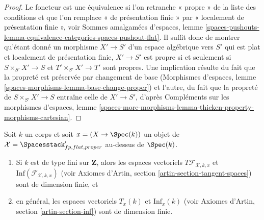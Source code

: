 \begin{proof}
Le foncteur est une équivalence si l'on retranche « propre » de la liste des
conditions et que l'on remplace « de présentation finie » par
« localement de présentation finie », voir Sommes amalgamées d'espaces, lemme
\ref{spaces-pushouts-lemma-equivalence-categories-spaces-pushout-flat}.
Il suffit donc de montrer qu'étant donné un morphisme $X' \to S'$ d'un espace
algébrique vers $S'$ qui est plat et localement de présentation finie,
$X' \to S'$ est propre si et seulement si
$S \times_{S'} X' \to S$ et $T' \times_{S'} X' \to T'$ sont propres.
Une implication résulte du fait que la propreté est préservée par changement de
base (Morphismes d'espaces, lemme
\ref{spaces-morphisms-lemma-base-change-proper}) et l'autre, du fait que la
propreté de $S \times_{S'} X' \to S$ entraîne celle de $X' \to S'$, d'après
Compléments sur les morphismes d'espaces, lemme
\ref{spaces-more-morphisms-lemma-thicken-property-morphisms-cartesian}.
\end{proof}

\begin{lemma}
\label{lemma-spaces-tangent-space}
Soit $k$ un corps et soit $x = (X \to \Spec(k))$ un objet de
$\mathcal{X} = \Spacesstack'_{fp, flat, proper}$ au-dessus de $\Spec(k)$.
\begin{enumerate}
\item Si $k$ est de type fini sur $\mathbf{Z}$, alors les espaces vectoriels
$T\mathcal{F}_{\mathcal{X}, k, x}$ et
$\text{Inf}(\mathcal{F}_{\mathcal{X}, k, x})$
(voir Axiomes d'Artin, section \ref{artin-section-tangent-spaces})
sont de dimension finie, et
\item en général, les espaces vectoriels $T_x(k)$ et $\text{Inf}_x(k)$
(voir Axiomes d'Artin, section \ref{artin-section-inf})
sont de dimension finie.
\end{enumerate}
\end{lemma}

